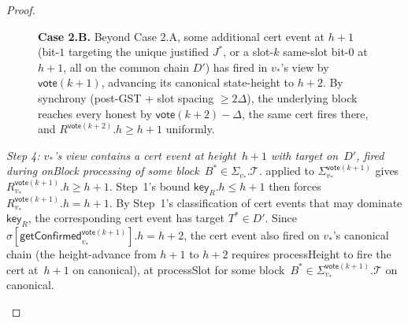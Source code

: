 \documentclass{article}
\newcommand{\T}[0]{\ensuremath{\mathcal{T}}}
\newcommand{\key}{\mathsf{key}}
\newcommand{\vote}{\mathsf{vote}}
\newcommand{\getConfirmed}{\textsf{getConfirmed}\xspace}
\theoremstyle{plain}
\theoremstyle{definition}
\theoremstyle{remark}
\begin{document}
\begin{proof}
\begin{description}
\begin{description}
\begin{figure}[H]
\caption{\label{rev:fig:hfj-case2b}\textbf{Case 2.B.} Beyond Case 2.A, some additional cert event at $h+1$ (bit-$1$ targeting the unique justified $J^*$, or a slot-$k$ same-slot bit-$0$ at $h+1$, all on the common chain $D'$) has fired in $v_*$'s view by $\vote(k+1)$, advancing its canonical state-height to $h+2$. By synchrony (post-GST + slot spacing $\geq 2\Delta$), the underlying block reaches every honest by $\vote(k+2) - \Delta$, the same cert fires there, and $R^{\vote(k+2)}.h \geq h+1$ uniformly.}
\end{figure}

\emph{Step 4: $v_*$'s view contains a cert event at height~$h+1$ with target on~$D'$, fired during onBlock processing of some block~$B^* \in \Sigma_{v_*}.\T$.}
 applied to $\Sigma_{v_*}^{\vote(k+1)}$ gives $R_{v_*}^{\vote(k+1)}.h \geq h+1$. Step~1's bound $\key_R.h \leq h+1$ then forces $R_{v_*}^{\vote(k+1)}.h = h+1$. By Step~1's classification of cert events that may dominate $\key_R$, the corresponding cert event has target $T^* \in D'$. Since $\sigma[\getConfirmed_{v_*}^{\vote(k+1)}].h = h+2$, the cert event also fired on $v_*$'s canonical chain (the height-advance from $h+1$ to $h+2$ requires processHeight to fire the cert at~$h+1$ on canonical), at processSlot for some block~$B^* \in \Sigma_{v_*}^{\vote(k+1)}.\T$ on canonical.


\end{description}
\end{description}
\end{proof}
\end{document}
